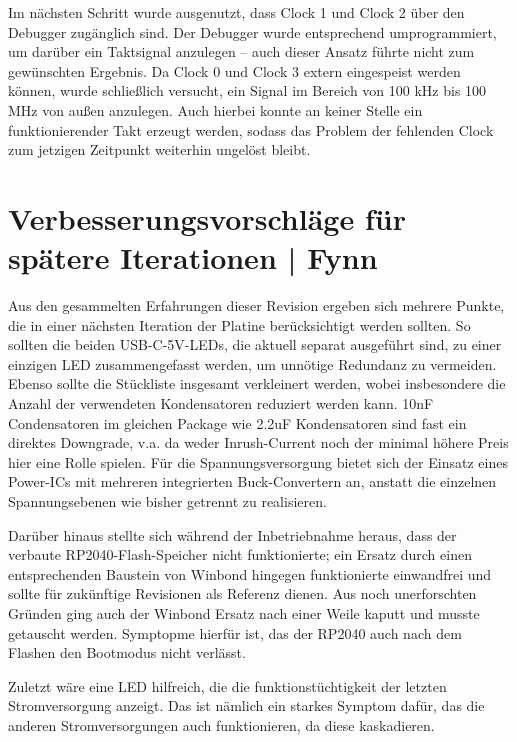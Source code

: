 \documentclass[a4paper,11pt]{article}
\begin{document}

Im nächsten Schritt wurde ausgenutzt, dass Clock 1 und Clock 2 über den Debugger zugänglich sind.
Der Debugger wurde entsprechend umprogrammiert, um darüber ein Taktsignal anzulegen – auch dieser Ansatz führte nicht zum gewünschten Ergebnis.
Da Clock 0 und Clock 3 extern eingespeist werden können, wurde schließlich versucht, ein Signal im Bereich von 100 kHz bis 100 MHz von außen anzulegen.
Auch hierbei konnte an keiner Stelle ein funktionierender Takt erzeugt werden, sodass das Problem der fehlenden Clock zum jetzigen Zeitpunkt weiterhin ungelöst bleibt.


\section{Verbesserungsvorschläge für spätere Iterationen | Fynn}
Aus den gesammelten Erfahrungen dieser Revision ergeben sich mehrere Punkte, die in einer nächsten Iteration der Platine berücksichtigt werden sollten.
So sollten die beiden USB-C-5V-LEDs, die aktuell separat ausgeführt sind, zu einer einzigen LED zusammengefasst werden, um unnötige Redundanz zu vermeiden.
Ebenso sollte die Stückliste insgesamt verkleinert werden, wobei insbesondere die Anzahl der verwendeten Kondensatoren reduziert werden kann.
10nF Condensatoren im gleichen Package wie 2.2uF Kondensatoren sind fast ein direktes Downgrade,
v.a. da weder Inrush-Current noch der minimal höhere Preis hier eine Rolle spielen.
Für die Spannungsversorgung bietet sich der Einsatz eines Power-ICs mit mehreren integrierten Buck-Convertern an,
anstatt die einzelnen Spannungsebenen wie bisher getrennt zu realisieren.

Darüber hinaus stellte sich während der Inbetriebnahme heraus, dass der verbaute RP2040-Flash-Speicher nicht funktionierte;
ein Ersatz durch einen entsprechenden Baustein von Winbond hingegen funktionierte einwandfrei und sollte für zukünftige Revisionen als Referenz dienen.
Aus noch unerforschten Gründen ging auch der Winbond Ersatz nach einer Weile kaputt und musste getauscht werden.
Symptopme hierfür ist, das der RP2040 auch nach dem Flashen den Bootmodus nicht verlässt.

Zuletzt wäre eine LED hilfreich,
die die funktionstüchtigkeit der letzten Stromversorgung anzeigt.
Das ist nämlich ein starkes Symptom dafür,
das die anderen Stromversorgungen auch funktionieren,
da diese kaskadieren.
\newpage
\end{document}

